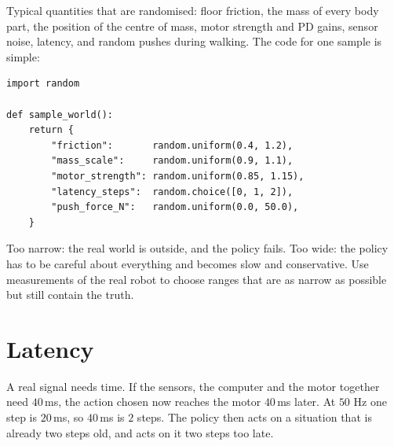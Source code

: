 Typical quantities that are randomised: floor friction, the mass of every body part, the position of the centre of mass, motor strength and PD gains, sensor noise, latency, and random pushes during walking. The code for one sample is simple:

\begin{verbatim}
import random

def sample_world():
    return {
        "friction":       random.uniform(0.4, 1.2),
        "mass_scale":     random.uniform(0.9, 1.1),
        "motor_strength": random.uniform(0.85, 1.15),
        "latency_steps":  random.choice([0, 1, 2]),
        "push_force_N":   random.uniform(0.0, 50.0),
    }
\end{verbatim}

\begin{keyidea}
Too narrow: the real world is outside, and the policy fails. Too wide: the policy has to be careful about everything and becomes slow and conservative. Use measurements of the real robot to choose ranges that are as narrow as possible but still contain the truth.
\end{keyidea}

\section*{Latency}
A real signal needs time. If the sensors, the computer and the motor together need $40$\,ms, the action chosen now reaches the motor $40$\,ms later. At $50$ Hz one step is $20$\,ms, so $40$\,ms is $2$ steps. The policy then acts on a situation that is already two steps old, and acts on it two steps too late.

\begin{center}
\label{fig:rl6_latency}
\end{center}

